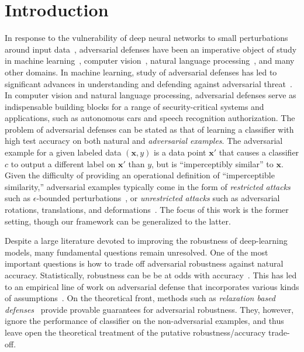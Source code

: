 \documentclass[11pt]{article}
\newcommand{\x}{\bm{x}}
\newcommand{\0}{\mathbf{0}}
\newcommand{\1}{\mathbf{1}}
\begin{document}
\section{Introduction}
In response to the vulnerability of deep neural networks to small perturbations around input data~\cite{szegedy2013intriguing}, adversarial defenses have been an imperative object of study in machine learning~\cite{huang2017adversarial}, computer vision~\cite{song2018pixeldefend,xie2017adversarial,meng2017magnet}, natural language processing~\cite{jia2017adversarial}, and many other domains. In machine learning, study of adversarial defenses has led to significant advances in understanding and defending against adversarial threat~\cite{he2017adversarial}. In computer vision and natural language processing, adversarial defenses serve as indispensable building blocks for a range of security-critical systems and applications, such as autonomous cars and speech recognition authorization. The problem of adversarial defenses can be stated as that of learning a classifier with high test accuracy on both natural and \emph{adversarial examples}. The adversarial example for a given labeled data $(\x,y)$ is a data point $\x'$ that causes a classifier $c$ to output a different label on $\x'$ than $y$, but is ``imperceptibly similar'' to $\x$. Given the difficulty of providing an operational definition of ``imperceptible similarity,''  adversarial examples typically come in the form of \emph{restricted attacks} such as $\epsilon$-bounded perturbations~\cite{szegedy2013intriguing}, or \emph{unrestricted attacks} such as adversarial rotations, translations, and deformations~\cite{brown2018unrestricted,engstrom2017rotation,gilmer2018motivating,xiao2018spatially,alaifari2018adef,zhang2018limitations}. The focus of this work is the former setting, though our framework can be generalized to the latter. 

Despite a large literature devoted to improving the robustness of deep-learning models, many fundamental questions remain unresolved. One of the most important questions is how to trade off adversarial robustness against natural accuracy. Statistically, robustness can be be at odds with accuracy~\cite{tsipras2018robustness}. This has led to an empirical line of work on adversarial defense that incorporates various kinds of assumptions~\cite{su2018robustness,kurakin2016adversarial}. On the theoretical front, methods such as \emph{relaxation based defenses}~\cite{kolter2017provable,raghunathan2018certified}  provide provable guarantees for adversarial robustness. They, however, ignore the performance of classifier on the non-adversarial examples, and thus leave open the theoretical treatment of the putative robustness/accuracy trade-off.
\end{document}
